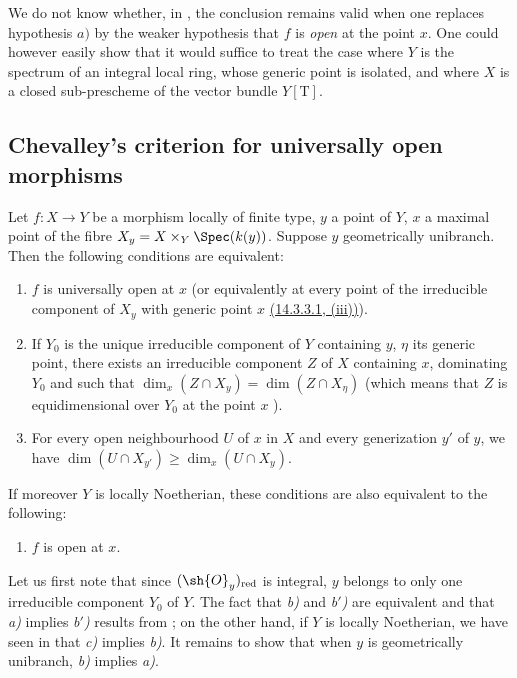 \begin{remark}[14.3.14]
\label{IV.14.3.14}
We do not know whether, in , the conclusion remains valid when one replaces hypothesis $a)$ by the weaker hypothesis that $f$ is \emph{open} at the point $x$.
One could however easily show that it would suffice to treat the case where $Y$ is the spectrum of an integral local ring, whose generic point is isolated, and where $X$ is a closed sub-prescheme of the vector bundle $Y[\mathrm{T}]$.
\end{remark}
\subsection{Chevalley's criterion for universally open morphisms}
\label{subsection:IV.14.4}

\begin{theorem}[14.4.1]
\label{IV.14.4.1}
Let $f:X\to Y$ be a morphism locally of finite type, $y$ a point of $Y$, $x$ a maximal point of the fibre $X_y=X\times_Y\Spec(k(y))$.
Suppose $y$ geometrically unibranch.
Then the following conditions are equivalent:
\begin{enumerate}[label=\emph{\alph*)}]
  \item $f$ is universally open at $x$ (or equivalently at every point of the irreducible component of $X_y$ with generic point $x$ \hyperref[IV.14.3.3.1]{(14.3.3.1, (iii))}).
  \item If $Y_0$ is the unique irreducible component of $Y$ containing $y$, $\eta$ its generic point, there exists an irreducible component $Z$ of $X$ containing $x$, dominating $Y_0$ and such that $\dim_x(Z\cap X_y)=\dim(Z\cap X_\eta)$ (which means that $Z$ is equidimensional over $Y_0$ at the point $x$ ).
  \item[\emph{b$'$)}] For every open neighbourhood $U$ of $x$ in $X$ and every generization $y'$ of $y$, we have $\dim(U\cap X_{y'})\geq\dim_x(U\cap X_y)$.
\end{enumerate}
If moreover $Y$ is locally Noetherian, these conditions are also equivalent to the following:
\begin{enumerate}[label=\emph{\alph*)}]
  \item[\emph{c)}] $f$ is open at $x$.
\end{enumerate}
\end{theorem}

Let us first note that since $(\sh{O}_y)_{\mathrm{red}}$ is integral, $y$ belongs to only one irreducible component $Y_0$ of $Y$.
The fact that \emph{b)} and \emph{b$'$)} are equivalent and that \emph{a)} implies \emph{b$'$)} results from ; on the other hand, if $Y$ is locally Noetherian, we have seen in  that \emph{c)} implies \emph{b)}.
It remains to show that when $y$ is geometrically unibranch, \emph{b)} implies \emph{a)}.

